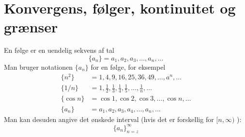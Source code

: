 \chapter{Konvergens, følger, kontinuitet og grænser}
En følge er en uendelig sekvens af tal\begin{equation}
    \{a_n\}=a_1,a_2,a_3,\ldots,a_n,\ldots
\end{equation}Man bruger notationen $\{a_n\}$ for en følge, for eksempel\begin{align*}
    \{n^2\}&=1,4,9,16,25,36,49,\ldots,a^n,\ldots\\
    \{1/n\}&=1,\frac{1}{2},\frac{1}{3},\frac{1}{4},\frac{1}{5},\ldots,\frac{1}{n},\ldots\\
    \{\cos{n}\}&=\cos{1},\cos{2},\cos{3},\ldots,\cos{n},\ldots\\
    \{a_n\}&=a_1,a_2,a_3,a_4,\ldots,a_n,\ldots
\end{align*}
Man kan desuden angive det ønskede interval (hvis det er forskellig for $[n,\infty)$  ):$$\{a_n\}_{n=z}^\infty$$
